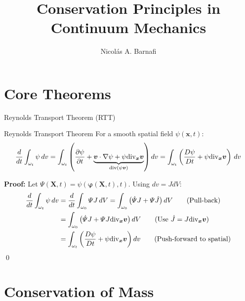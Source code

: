 \documentclass[aspectratio=169]{beamer}
\title[Conservation Principles]{Conservation Principles in Continuum Mechanics}
\author{Nicol\'as A. Barnafi}
\date{}
\renewcommand{\vec}{\vectorsym}
\begin{document}
\begin{frame}
    \titlepage
\end{frame}

\section{Core Theorems}


\begin{frame}{Reynolds Transport Theorem (RTT)}
    
    \vspace{0.2cm}
    \begin{block}{Reynolds Transport Theorem}
        For a smooth spatial field $\psi(\bm{x}, t)$:
        $$ \frac{d}{dt} \int_{\omega_t} \psi \, dv = \int_{\omega_t} \left( \frac{\partial \psi}{\partial t} + \underbrace{\vec v\cdot \nabla \psi + \psi \text{div}_{\vec{x}} \vec{v}}_{\text{div}\left(\psi\vec v\right)} \right) dv = \int_{\omega_t} \left( \frac{D\psi}{Dt} + \psi \text{div}_{\vec x} \vec v\right)\,dv$$

    \end{block}
    
    \pause \textbf{Proof:}
    Let $\Psi(\bm{X}, t) = \psi(\bm{\varphi}(\bm{X}, t), t)$. Using $dv = J dV$:
    \begin{align*}
        \frac{d}{dt} \int_{\omega_t} \psi \, dv &= \frac{d}{dt} \int_{\omega_0} \Psi J \, dV = \int_{\omega_0} \left( \dot{\Psi} J + \Psi \dot{J} \right) dV \tag{Pull-back} \\
        &= \int_{\omega_0} \left( \dot{\Psi} J + \Psi J \text{div}_{\bm{x}} \bm{v} \right) dV \tag{Use $\dot{J} = J \text{div}_{\bm{x}} \bm{v}$} \\
        &= \int_{\omega_t} \left( \frac{D\psi}{Dt} + \psi \text{div}_{\bm{x}} \bm{v} \right) dv \tag{Push-forward to spatial}
    \end{align*} \qed
\end{frame}

\section{Conservation of Mass}
\end{document}
